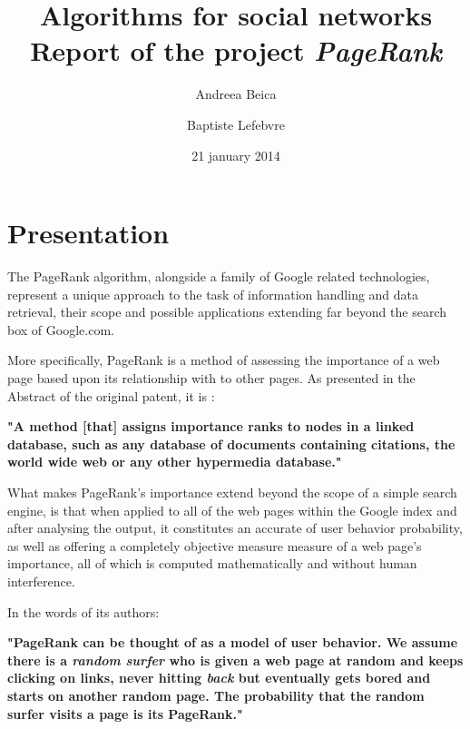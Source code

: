 \documentclass[pdftex,12pt,a4paper]{article}
\begin{document}
\title{
	\Large \textbf{Algorithms for social networks} \\
	\textsf{Report of the project \emph{PageRank}}
}
\author{Andreea Beica \and Baptiste Lefebvre}
\date{21 january 2014}

\maketitle


\section{Presentation}

The PageRank algorithm, alongside a family of Google related technologies, represent a unique approach to the task of information handling and data retrieval, their scope and possible applications extending far beyond the search box of Google.com.

More specifically, PageRank is a method of assessing the importance of a web page based upon its relationship with to other pages. As presented in the Abstract of the original patent, it is :

\vspace{10pt}

\begin{centering}
\textbf{"A method [that] assigns importance ranks to nodes in a linked database, such as any database of documents containing citations, the world wide web or any other hypermedia database."}
\end{centering}
\vspace{10pt}

What makes PageRank's importance extend beyond the scope of a simple search engine, is that when applied to all of the web pages within the Google index and after analysing the output, it constitutes an accurate of user behavior probability, as well as offering a completely objective measure measure of a web page's importance, all of which is computed mathematically and without human interference. 

In the words of its authors:

\vspace{10pt}

\begin{centering}
\textbf{"PageRank can be thought of as a model of user behavior. We assume there is a \emph{random surfer} who is given a web page at random and keeps clicking on links, never hitting \emph{back} but eventually gets bored and starts on another random page. The probability that the random surfer visits a page is its PageRank."}
\end{centering}
\vspace{10pt}
\end{document}
